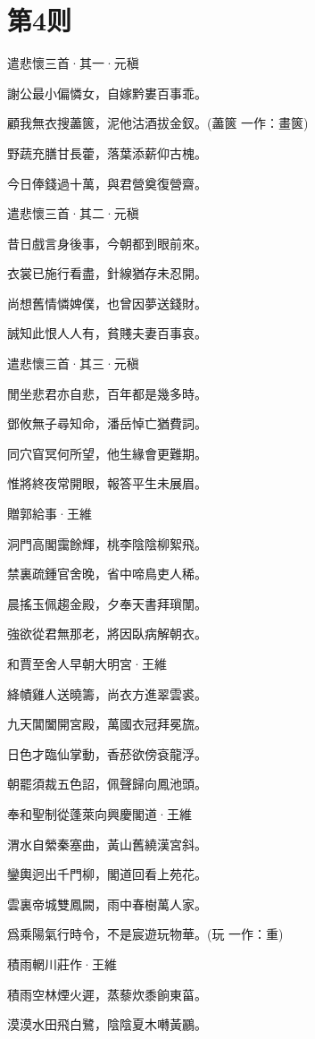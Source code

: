 \documentclass[12pt,a4paper]{ctexbook}
\begin{document}
\section{第4则}
遣悲懷三首·其一·元稹\par
謝公最小偏憐女，自嫁黔婁百事乖。\par
顧我無衣搜藎篋，泥他沽酒拔金釵。(藎篋 一作：畫篋)\par
野蔬充膳甘長藿，落葉添薪仰古槐。\par
今日俸錢過十萬，與君營奠復營齋。\par
遣悲懷三首·其二·元稹\par
昔日戲言身後事，今朝都到眼前來。\par
衣裳已施行看盡，針線猶存未忍開。\par
尚想舊情憐婢僕，也曾因夢送錢財。\par
誠知此恨人人有，貧賤夫妻百事哀。\par
遣悲懷三首·其三·元稹\par
閒坐悲君亦自悲，百年都是幾多時。\par
鄧攸無子尋知命，潘岳悼亡猶費詞。\par
同穴窅冥何所望，他生緣會更難期。\par
惟將終夜常開眼，報答平生未展眉。\par
贈郭給事·王維\par
洞門高閣靄餘輝，桃李陰陰柳絮飛。\par
禁裏疏鍾官舍晚，省中啼鳥吏人稀。\par
晨搖玉佩趨金殿，夕奉天書拜瑣闈。\par
強欲從君無那老，將因臥病解朝衣。\par
和賈至舍人早朝大明宮·王維\par
絳幘雞人送曉籌，尚衣方進翠雲裘。\par
九天閶闔開宮殿，萬國衣冠拜冕旒。\par
日色才臨仙掌動，香菸欲傍袞龍浮。\par
朝罷須裁五色詔，佩聲歸向鳳池頭。\par
奉和聖制從蓬萊向興慶閣道·王維\par
渭水自縈秦塞曲，黃山舊繞漢宮斜。\par
鑾輿迥出千門柳，閣道回看上苑花。\par
雲裏帝城雙鳳闕，雨中春樹萬人家。\par
爲乘陽氣行時令，不是宸遊玩物華。(玩 一作：重)\par
積雨輞川莊作·王維\par
積雨空林煙火遲，蒸藜炊黍餉東菑。\par
漠漠水田飛白鷺，陰陰夏木囀黃鸝。\par
\end{document}
